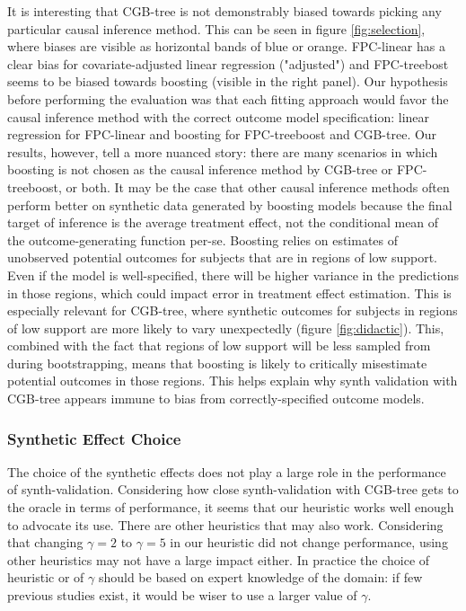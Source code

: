


It is interesting that CGB-tree is not demonstrably biased towards picking any particular causal inference method. This can be seen in figure \ref{fig:selection}, where biases are visible as horizontal bands of blue or orange. FPC-linear has a clear bias for covariate-adjusted linear regression ("adjusted") and FPC-treebost seems to be biased towards boosting (visible in the right panel). Our hypothesis before performing the evaluation was that each fitting approach would favor the causal inference method with the correct outcome model specification: linear regression for FPC-linear and boosting for FPC-treeboost and CGB-tree. Our results, however, tell a more nuanced story: there are many scenarios in which boosting is not chosen as the causal inference method by CGB-tree or FPC-treeboost, or both. It may be the case that other causal inference methods often perform better on synthetic data generated by boosting models because the final target of inference is the average treatment effect, not the conditional mean of the outcome-generating function per-se. Boosting relies on estimates of unobserved potential outcomes for subjects that are in regions of low support. Even if the model is well-specified, there will be higher variance in the predictions in those regions, which could impact error in treatment effect estimation. This is especially relevant for CGB-tree, where synthetic outcomes for subjects in regions of low support are more likely to vary unexpectedly (figure \ref{fig:didactic}). This, combined with the fact that regions of low support will be less sampled from during bootstrapping, means that boosting is likely to critically misestimate potential outcomes in those regions. This helps explain why synth validation with CGB-tree appears immune to bias from correctly-specified outcome models.

\subsubsection{Synthetic Effect Choice}
The choice of the synthetic effects does not play a large role in the performance of synth-validation. Considering how close synth-validation with CGB-tree gets to the oracle in terms of performance, it seems that our heuristic works well enough to advocate its use. There are other heuristics that may also work. Considering that changing $\gamma=2$ to $\gamma=5$ in our heuristic did not change performance, using other heuristics may not have a large impact either. In practice the choice of heuristic or of $\gamma$ should be based on expert knowledge of the domain: if few previous studies exist, it would be wiser to use a larger value of $\gamma$. %

